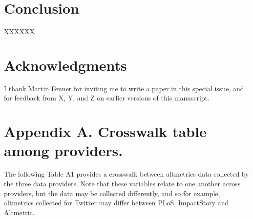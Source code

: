 \documentclass[letterpaper,superscriptaddress,showkeys,longbibliography]{revtex4-1}
\begin{document}
\section{Conclusion}

XXXXXX

\section{Acknowledgments}

I thank Martin Fenner for inviting me to write a paper in this special issue, and for feedback from X, Y, and Z on earlier versions of this manuscript.



\section{Appendix A. Crosswalk table among providers.}

The following Table A1 provides a crosswalk between altmetrics data collected by the three data providers. Note that these variables relate to one another across providers, but the data may be collected differently, and so for example, altmetrics collected for Twitter may differ between PLoS, ImpactStory and Altmetric.  
\end{document}
